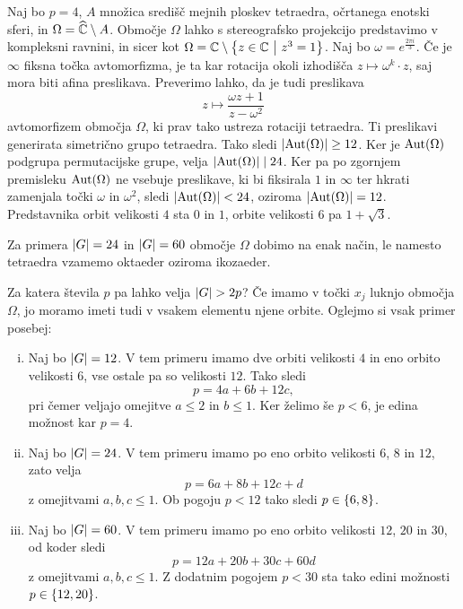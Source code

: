 \begin{zgled}
Naj bo $p = 4$, $A$ množica središč mejnih ploskev tetraedra,
očrtanega enotski sferi, in $\Omega = \widehat{\mathbb{C}} \setminus A$. Območje
$\Omega$ lahko s stereografsko projekcijo predstavimo v kompleksni
ravnini, in sicer kot
$\Omega = \mathbb{C} \setminus \left\{z \in \mathbb{C}~\middle\vert~z^3 = 1\right\}$. Naj bo
$\omega = e^{\frac{2 \pi i}{3}}$. Če je $\infty$ fiksna točka
avtomorfizma, je ta kar rotacija okoli izhodišča
$z \mapsto \omega^k \cdot z$, saj mora biti afina preslikava.
Preverimo lahko, da je tudi preslikava
\[
z \mapsto \frac{\omega z + 1}{z - \omega^2}
\]
avtomorfizem območja $\Omega$, ki prav tako ustreza rotaciji
tetraedra. Ti preslikavi generirata simetrično grupo tetraedra.
Tako sledi $\left\lvert \operatorname{Aut}(\Omega)\right\rvert \geq 12$. Ker je $\operatorname{Aut}(\Omega)$
podgrupa permutacijske grupe, velja $\left\lvert \operatorname{Aut}(\Omega)\right\rvert \mid 24$.
Ker pa po zgornjem premisleku $\operatorname{Aut}(\Omega)$ ne vsebuje preslikave,
ki bi fiksirala $1$ in $\infty$ ter hkrati zamenjala točki $\omega$
in $\omega^2$, sledi $\left\lvert \operatorname{Aut}(\Omega)\right\rvert < 24$, oziroma
$\left\lvert \operatorname{Aut}(\Omega)\right\rvert = 12$. Predstavnika orbit velikosti $4$ sta $0$
in $1$, orbite velikosti $6$ pa $1 + \sqrt{3}$.
\end{zgled}

Za primera $\left\lvert G\right\rvert = 24$ in $\left\lvert G\right\rvert = 60$ območje $\Omega$ dobimo
na enak način, le namesto tetraedra vzamemo oktaeder oziroma
ikozaeder.

Za katera števila $p$ pa lahko velja $\left\lvert G\right\rvert > 2p$? Če imamo v
točki $x_j$ luknjo območja $\Omega$, jo moramo imeti tudi v vsakem
elementu njene orbite. Oglejmo si vsak primer posebej:

\begin{enumerate}[i)]
\item Naj bo $\left\lvert G\right\rvert = 12$. V tem primeru imamo dve orbiti
velikosti $4$ in eno orbito velikosti $6$, vse ostale pa so
velikosti $12$. Tako sledi
\[
p = 4a + 6b + 12c,
\]
pri čemer veljajo omejitve $a \leq 2$ in $b \leq 1$. Ker želimo še
$p < 6$, je edina možnost kar $p = 4$.

\item Naj bo $\left\lvert G\right\rvert = 24$. V tem primeru imamo po eno orbito
velikosti $6$, $8$ in $12$, zato velja
\[
p = 6a + 8b + 12c + d
\]
z omejitvami $a, b, c \leq 1$. Ob pogoju $p < 12$ tako sledi
$p \in \left\{6, 8\right\}$.

\item Naj bo $\left\lvert G\right\rvert = 60$. V tem primeru imamo po eno orbito
velikosti $12$, $20$ in $30$, od koder sledi
\[
p = 12a + 20b + 30c + 60d
\]
z omejitvami $a, b, c \leq 1$. Z dodatnim pogojem $p < 30$ sta tako
edini možnosti $p \in \left\{12, 20\right\}$.
\end{enumerate}

